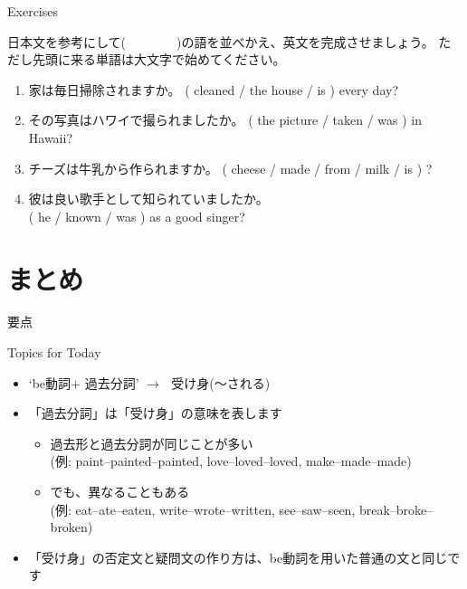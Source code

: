 \documentclass[aspectratio=169,xcolor={dvipsnames,table}]{beamer}
\begin{document}
\begin{frame}[plain]{Exercises}
 
日本文を参考にして(~~~~~~~~)の語を並べかえ、英文を完成させましょう。
ただし先頭に来る単語は大文字で始めてください。



\begin{enumerate}
 \item 家は毎日掃除されますか。
( cleaned / the house / is ) every day?\\
 \item その写真はハワイで撮られましたか。
( the picture / taken /  was ) in Hawaii?\\
 \item チーズは牛乳から作られますか。
( cheese / made / from / milk / is ) ?\\
 \item 彼は良い歌手として知られていましたか。\\
( he / known /  was ) as a good singer?\\
\end{enumerate}

\end{frame}

\section{まとめ}
\begin{frame}[plain]{要点}
 
\begin{exampleblock}{Topics for Today}
\begin{itemize}\small
 \item `be動詞$+$ 過去分詞' $\longrightarrow$\,\,\,\,受け身(〜される)
 \item 「過去分詞」は「受け身」の意味を表します
        \begin{itemize}
	 \item 過去形と過去分詞が同じことが多い\\
\mbox{}\hfill{}(例: paint--painted--painted, love--loved--loved, make--made--made)
	 \item でも、異なることもある\\
\mbox{}\hfill{}(例: eat--ate--eaten, write--wrote--written, see--saw--seen, break--broke--broken)
	\end{itemize}
 \item 「受け身」の否定文と疑問文の作り方は、be動詞を用いた普通の文と同じです
\end{itemize}
     \end{exampleblock}
\end{frame}
\end{document}

